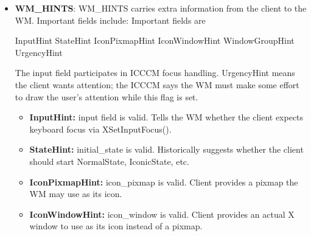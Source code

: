\documentclass{report}
\begin{document}
\begin{itemize}
            \bigbreak \noindent 
            Important fields are 
            \bigbreak \noindent 
            \begin{cppcode}
                PMinSize      // min_width, min_height
                PMaxSize      // max_width, max_height
                PBaseSize     // base_width, base_height
                PResizeInc    // width_inc, height_inc
                PAspect       // min_aspect, max_aspect
                PWinGravity   // win_gravity
                USPosition    // user-specified position
                USSize        // user-specified size
                PPosition     // program-specified position
                PSize         // program-specified size
            \end{cppcode}
            \bigbreak \noindent 
            For tiling, the big one is PResizeInc. Terminals often want sizes in character-cell increments. If you ignore increments, terminals still work, but you may get ugly unused padding. A simple first WM can ignore this; a better WM applies increments after computing the tile rectangle.
        \item \textbf{WM\_HINTS}: WM\_HINTS carries extra information from the client to the WM. Important fields include:
            \bigbreak \noindent 
            Important fields are
            \bigbreak \noindent 
            \begin{cppcode}
                InputHint
                StateHint
                IconPixmapHint
                IconWindowHint
                WindowGroupHint
                UrgencyHint
            \end{cppcode}
            \bigbreak \noindent 
            The input field participates in ICCCM focus handling. UrgencyHint means the client wants attention; the ICCCM says the WM must make some effort to draw the user’s attention while this flag is set.
            \begin{itemize}
                \item \textbf{InputHint:} input field is valid. Tells the WM whether the client expects keyboard focus via XSetInputFocus().
                \item \textbf{StateHint:} initial\_state is valid. Historically suggests whether the client should start NormalState, IconicState, etc.
                \item \textbf{IconPixmapHint:} icon\_pixmap is valid. Client provides a pixmap the WM may use as its icon.
                \item \textbf{IconWindowHint:} icon\_window is valid. Client provides an actual X window to use as its icon instead of a pixmap.

\end{itemize}
\end{itemize}
\end{document}
